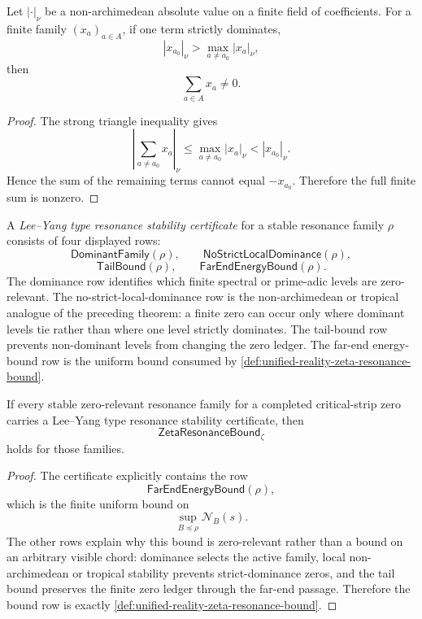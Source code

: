 \begin{theorem}
\label{thm:unified-reality-nonarchimedean-dominance-prevents-finite-silence}
Let $|\cdot|_{\nu}$ be a non-archimedean absolute value on a finite
field of coefficients.  For a finite family $(x_a)_{a\in A}$, if one
term strictly dominates,
$$
|x_{a_0}|_{\nu}
>
\max_{a\ne a_0}|x_a|_{\nu},
$$
then
$$
\sum_{a\in A}x_a\ne0.
$$
\end{theorem}

\begin{proof}
The strong triangle inequality gives
$$
\left|\sum_{a\ne a_0}x_a\right|_{\nu}
\le
\max_{a\ne a_0}|x_a|_{\nu}
<
|x_{a_0}|_{\nu}.
$$
Hence the sum of the remaining terms cannot equal $-x_{a_0}$.  Therefore
the full finite sum is nonzero.
\end{proof}

\begin{definition}
\label{def:unified-reality-lee-yang-type-resonance-stability-certificate}
A \emph{Lee--Yang type resonance stability certificate} for a stable
resonance family $\rho$ consists of four displayed rows:
$$
\mathsf{DominantFamily}(\rho),
\qquad
\mathsf{NoStrictLocalDominance}(\rho),
$$
$$
\mathsf{TailBound}(\rho),
\qquad
\mathsf{FarEndEnergyBound}(\rho).
$$
The dominance row identifies which finite spectral or prime-adic levels
are zero-relevant.  The no-strict-local-dominance row is the
non-archimedean or tropical analogue of the preceding theorem: a finite
zero can occur only where dominant levels tie rather than where one
level strictly dominates.  The tail-bound row prevents non-dominant
levels from changing the zero ledger.  The far-end energy-bound row is
the uniform bound consumed by
\autoref{def:unified-reality-zeta-resonance-bound}.
\end{definition}

\begin{theorem}
\label{thm:unified-reality-lee-yang-stability-supplies-resonance-bound}
If every stable zero-relevant resonance family for a completed
critical-strip zero carries a Lee--Yang type resonance stability
certificate, then
$$
\mathsf{ZetaResonanceBound}_{\zeta}
$$
holds for those families.
\end{theorem}

\begin{proof}
The certificate explicitly contains the row
$$
\mathsf{FarEndEnergyBound}(\rho),
$$
which is the finite uniform bound on
$$
\sup_{B\preceq\rho}\mathcal N_B(s).
$$
The other rows explain why this bound is zero-relevant rather than a
bound on an arbitrary visible chord: dominance selects the active family,
local non-archimedean or tropical stability prevents strict-dominance
zeros, and the tail bound preserves the finite zero ledger through the
far-end passage.  Therefore the bound row is exactly
\autoref{def:unified-reality-zeta-resonance-bound}.
\end{proof}

